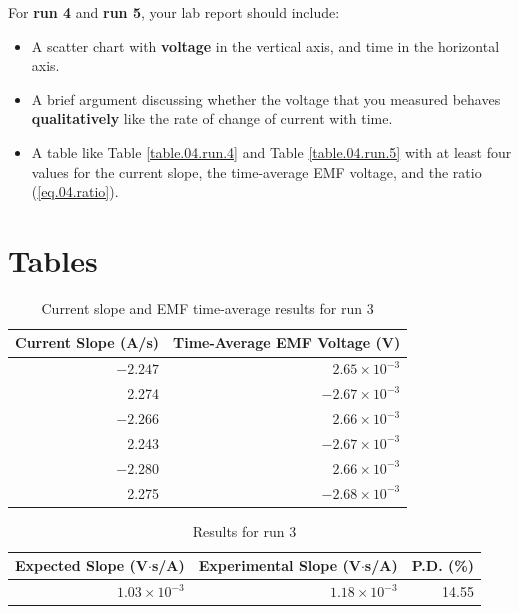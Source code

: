 For \textbf{run 4} and \textbf{run 5}, your lab report should include:
\begin{itemize}
	\item A scatter chart with \textbf{voltage} in the vertical axis, and time in the horizontal axis.
	\item A brief argument discussing whether the voltage that you measured behaves \textbf{qualitatively} like the rate of change of current with time.
	\item A table like Table \ref{table.04.run.4} and Table \ref{table.04.run.5} with at least four values for the current slope, the time-average EMF voltage, and the ratio (\ref{eq.04.ratio}).
\end{itemize}
\newpage
\section{Tables}
\begin{table}[ht]
	\centering
	\begin{tabular}{|r|r|}
		\hline
		Current Slope (A/s) & Time-Average EMF Voltage (V) \\
		\hline
		$-2.247$ & $2.65 \times 10^{-3}$ \\
		2.274 & $-2.67 \times 10^{-3}$ \\
		$-2.266$ & $2.66 \times 10^{-3}$ \\
		2.243 & $-2.67 \times 10^{-3}$ \\
		$-2.280$ & $2.66 \times 10^{-3}$ \\
		2.275 & $-2.68 \times 10^{-3}$ \\
		\hline
	\end{tabular}
	\caption{Current slope and EMF time-average results for run 3}
	\label{table.04.run.3.I.V}
\end{table}
\begin{table}[ht]
	\centering
	\begin{tabular}{|r|r|r|}
		\hline
		Expected Slope (V$\cdot$s/A) & Experimental Slope (V$\cdot$s/A) & P.D. (\%) \\
		\hline
		$1.03 \times 10^{-3}$ & $1.18 \times 10^{-3}$ & 14.55 \\
		\hline
	\end{tabular}
	\caption{Results for run 3}
	\label{table.04.run.3}
\end{table}
